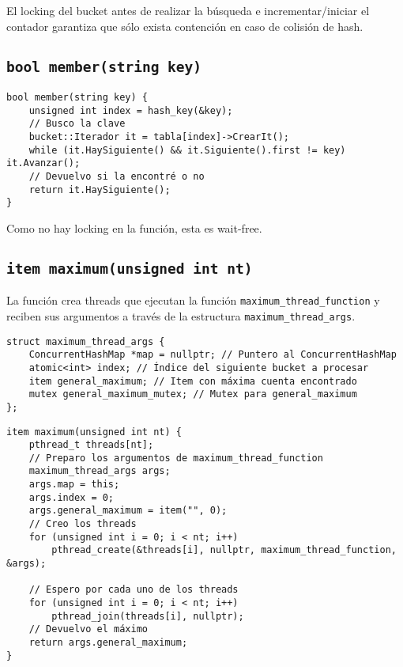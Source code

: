 El locking del bucket antes de realizar la búsqueda e incrementar/iniciar el contador garantiza que sólo exista contención en caso de colisión de hash.


\subsection{\texttt{bool member(string key)}}

\begin{verbatim}
bool member(string key) {
	unsigned int index = hash_key(&key);
	// Busco la clave
	bucket::Iterador it = tabla[index]->CrearIt();
	while (it.HaySiguiente() && it.Siguiente().first != key) it.Avanzar();
	// Devuelvo si la encontré o no
	return it.HaySiguiente();
}
\end{verbatim}

Como no hay locking en la función, esta es wait-free.


\subsection{\texttt{item maximum(unsigned int nt)}}

La función crea threads que ejecutan la función \texttt{maximum_thread_function} y reciben sus argumentos a través de la estructura \texttt{maximum_thread_args}.

\begin{verbatim}
struct maximum_thread_args {
	ConcurrentHashMap *map = nullptr; // Puntero al ConcurrentHashMap
	atomic<int> index; // Índice del siguiente bucket a procesar
	item general_maximum; // Item con máxima cuenta encontrado
	mutex general_maximum_mutex; // Mutex para general_maximum
};
\end{verbatim}

\begin{verbatim}
item maximum(unsigned int nt) {
	pthread_t threads[nt];
	// Preparo los argumentos de maximum_thread_function
	maximum_thread_args args;
	args.map = this;
	args.index = 0;
	args.general_maximum = item("", 0);
	// Creo los threads
	for (unsigned int i = 0; i < nt; i++)
		pthread_create(&threads[i], nullptr, maximum_thread_function, &args);

	// Espero por cada uno de los threads
	for (unsigned int i = 0; i < nt; i++)
		pthread_join(threads[i], nullptr);
	// Devuelvo el máximo
	return args.general_maximum;
}
\end{verbatim}

